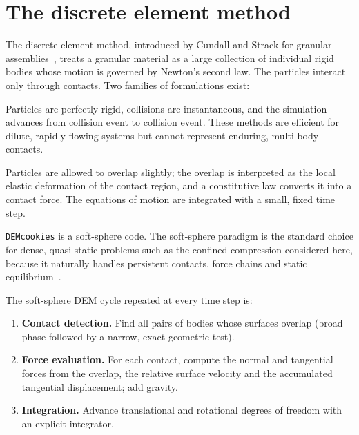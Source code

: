 \section{The discrete element method}
\label{sec:dem}

The discrete element method, introduced by Cundall and Strack for granular
assemblies~\cite{cundall1979}, treats a granular material as a large collection
of individual rigid bodies whose motion is governed by Newton's second law.  The
particles interact only through contacts.  Two families of formulations exist:

\begin{description}[leftmargin=1.6em,style=nextline]
  \item[Hard-sphere (event-driven) methods] Particles are perfectly rigid,
        collisions are instantaneous, and the simulation advances from collision
        event to collision event.  These methods are efficient for dilute,
        rapidly flowing systems but cannot represent enduring, multi-body
        contacts.
  \item[Soft-sphere (time-driven) methods] Particles are allowed to overlap
        slightly; the overlap is interpreted as the local elastic deformation of
        the contact region, and a constitutive law converts it into a contact
        force.  The equations of motion are integrated with a small, fixed time
        step.
\end{description}

\texttt{DEMcookies} is a soft-sphere code.  The soft-sphere paradigm is the
standard choice for dense, quasi-static problems such as the confined
compression considered here, because it naturally handles persistent contacts,
force chains and static equilibrium~\cite{osullivan2011,zhu2007}.

The soft-sphere DEM cycle repeated at every time step is:
\begin{enumerate}[leftmargin=2.2em]
  \item \textbf{Contact detection.}  Find all pairs of bodies whose surfaces
        overlap (broad phase followed by a narrow, exact geometric test).
  \item \textbf{Force evaluation.}  For each contact, compute the normal and
        tangential forces from the overlap, the relative surface velocity and
        the accumulated tangential displacement; add gravity.
  \item \textbf{Integration.}  Advance translational and rotational degrees of
        freedom with an explicit integrator.
\end{enumerate}

